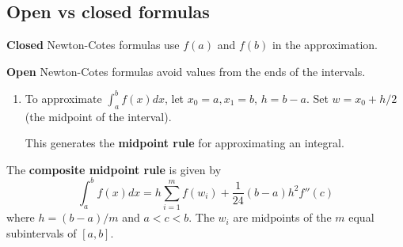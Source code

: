 \documentclass[12pt,letterpaper,noanswers]{exam}
\begin{document}
\subsection*{Open vs closed formulas}
\begin{tcolorbox}
\textbf{Closed} Newton-Cotes formulas use $f(a)$ and $f(b)$ in the approximation.

\textbf{Open} Newton-Cotes formulas avoid values from the ends of the intervals.
\end{tcolorbox}
\begin{enumerate}[resume=classQ]
    \item To approximate $\displaystyle\int_a^b f(x)dx$, let $x_0 = a, x_1 = b$, $h = b-a$.  Set $w = x_0 + h/2$ (the midpoint of the interval).
This generates the \textbf{midpoint rule} for approximating an integral.
\end{enumerate}
\begin{tcolorbox}
The \textbf{composite midpoint rule} is given by \[\int_a^bf(x)dx = h\sum\limits_{i=1}^m f(w_i) + \frac{1}{24}(b-a)h^2 f''(c)\] where $h = (b-a)/m$ and $a<c<b$.  The $w_i$ are midpoints of the $m$ equal subintervals of $[a,b]$.
\end{tcolorbox}
\end{document}
